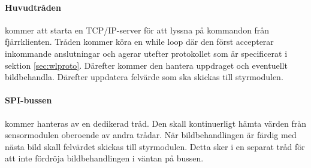 \documentclass[designspec/spec.tex]{subfiles}
\begin{document}
\paragraph{Huvudtråden} kommer att starta en TCP/IP-server för att lyssna på
kommandon från fjärrklienten. Tråden kommer köra en while loop där den först
accepterar inkommande anslutningar och agerar utefter protokollet som är
specificerat i sektion \ref{sec:wlproto}. Därefter kommer den hantera uppdraget
och eventuellt bildbehandla. Därefter uppdatera felvärde som ska skickas till
styrmodulen.

\paragraph{SPI-bussen} kommer hanteras av en dedikerad tråd. Den skall
kontinuerligt hämta värden från sensormodulen oberoende av andra trådar. När
bildbehandlingen är färdig med nästa bild skall felvärdet skickas till
styrmodulen. Detta sker i en separat tråd för att inte fördröja
bildbehandlingen i väntan på bussen.
\end{document}
